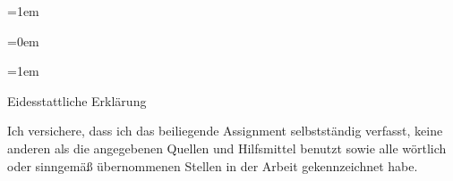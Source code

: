 \documentclass[a4paper,12pt]{article}
\newif\iflistoffigures
\newif\iflistoftables
\newif\ifacronym
\begin{document}
	
\parskip=1em
\parindent=0cm



\normalsize

\begin{spacing}{1.0} %
\parskip=0em
\newpage

\setcounter{tocdepth}{2}
\tableofcontents 
\newpage

\listoffigures 
\newpage

\iflistoftables
\listoftables 
\newpage
\fi

\ifacronym

\fi

\parskip=1em
\end{spacing} 

\clearpage

\setcounter{romanPagenumber}{\value{page}} %


\pagestyle{fancy}
\fancyhead{}
\fancyhead[LO,RE]{\textsc{\Titel}}
\fancyhead[RO,LE]{\thepage}
\fancyfoot[CO,CE]{}

\nocite{*} 


\begin{spacing}{1.5} %







\end{spacing}

\clearpage

\pagestyle{plain}
\setcounter{page}{\theromanPagenumber}


\onehalfspacing
\clearpage

\pagestyle{empty} 
\thispagestyle{empty}

\begin{center}
{\Large Eidesstattliche Erklärung}
\vspace*{4cm}\end{center}
\noindent
Ich versichere, dass ich das beiliegende Assignment selbstständig verfasst, keine anderen als die angegebenen Quellen und Hilfsmittel benutzt sowie alle wörtlich oder sinngemäß übernommenen Stellen in der Arbeit gekennzeichnet habe. 
\vspace{3cm}
\end{document}
